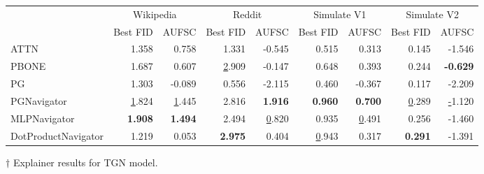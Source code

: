 \begin{tabular}{lrrrrrrrr}
\toprule
 & \multicolumn{2}{c}{Wikipedia} & \multicolumn{2}{c}{Reddit} & \multicolumn{2}{c}{Simulate V1} & \multicolumn{2}{c}{Simulate V2} \\
 & Best FID & AUFSC & Best FID & AUFSC & Best FID & AUFSC & Best FID & AUFSC \\
\midrule
ATTN & 1.358 & 0.758 & 1.331 & -0.545 & 0.515 & 0.313 & 0.145 & -1.546 \\
PBONE & 1.687 & 0.607 & \underline 2.909 & -0.147 & 0.648 & 0.393 & 0.244 & \bfseries -0.629 \\
PG & 1.303 & -0.089 & 0.556 & -2.115 & 0.460 & -0.367 & 0.117 & -2.209 \\
PGNavigator & \underline 1.824 & \underline 1.445 & 2.816 & \bfseries 1.916 & \bfseries 0.960 & \bfseries 0.700 & \underline 0.289 & \underline -1.120 \\
MLPNavigator & \bfseries 1.908 & \bfseries 1.494 & 2.494 & \underline 0.820 & 0.935 & \underline 0.491 & 0.256 & -1.460 \\
DotProductNavigator & 1.219 & 0.053 & \bfseries 2.975 & 0.404 & \underline 0.943 & 0.317 & \bfseries 0.291 & -1.391 \\
\bottomrule
\end{tabular}
\caption{\label{tab:tgn_results}$\dagger$ Explainer results for TGN model.}
